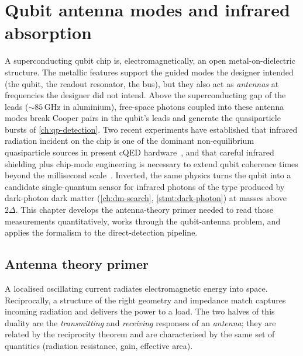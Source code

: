 \chapter{Qubit antenna modes and infrared absorption}
\label{ch:qubit-antenna}

A superconducting qubit chip is, electromagnetically, an open
metal-on-dielectric structure. The metallic features support the
guided modes the designer intended (the qubit, the readout
resonator, the bus), but they also act as
\emph{antennas} at frequencies the designer did not intend. Above
the superconducting gap of the leads ($\sim 85\,\text{GHz}$ in
aluminium), free-space photons coupled into these antenna modes
break Cooper pairs in the qubit's leads and generate the
quasiparticle bursts of \cref{ch:qp-detection}. Two recent
experiments have established that infrared radiation incident on
the chip is one of the dominant non-equilibrium quasiparticle
sources in present cQED hardware~\cite{vepsalainen2020,liu2024}, and
that careful infrared shielding plus chip-mode engineering is
necessary to extend qubit coherence times beyond the millisecond
scale~\cite{pan2022}. Inverted, the same physics turns the qubit
into a candidate single-quantum sensor for infrared photons of the
type produced by dark-photon dark matter
(\cref{ch:dm-search}, \cref{stmt:dark-photon}) at masses above
$2\Delta$. This chapter develops the antenna-theory primer needed
to read those measurements quantitatively, works through the
qubit-antenna problem, and applies the formalism to the
direct-detection pipeline.

\section{Antenna theory primer}
\label{sec:antenna-theory}

\begin{phenomenon}
A localised oscillating current radiates electromagnetic energy
into space. Reciprocally, a structure of the right geometry and
impedance match captures incoming radiation and delivers the
power to a load. The two halves of this duality are the
\emph{transmitting} and \emph{receiving} responses of an
\emph{antenna}; they are related by the reciprocity theorem and
are characterised by the same set of quantities (radiation
resistance, gain, effective area).
\end{phenomenon}

